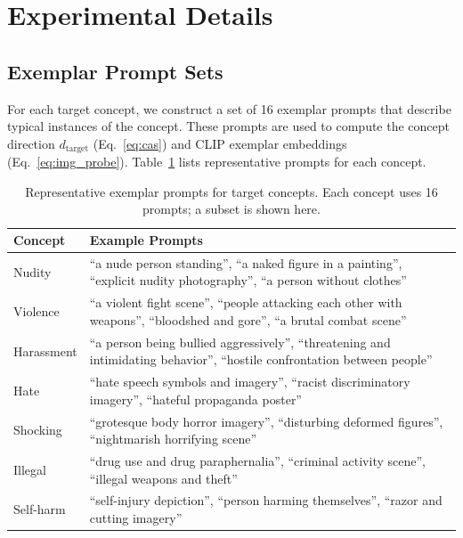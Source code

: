 \section{Experimental Details}
\label{app:details}

\subsection{Exemplar Prompt Sets}
\label{app:exemplars}

For each target concept, we construct a set of 16 exemplar prompts that describe typical instances of the concept. These prompts are used to compute the concept direction $d_\text{target}$ (Eq.~\ref{eq:cas}) and CLIP exemplar embeddings (Eq.~\ref{eq:img_probe}). Table~\ref{table:exemplar_prompts} lists representative prompts for each concept.

\begin{table}[h]
\centering
\caption{Representative exemplar prompts for target concepts. Each concept uses 16 prompts; a subset is shown here.}
\label{table:exemplar_prompts}
\small
\renewcommand{\arraystretch}{1.1}
\setlength{\tabcolsep}{0.5em}
\begin{tabular}{@{}l p{9cm}@{}}
\toprule
\textbf{Concept} & \textbf{Example Prompts} \\
\midrule
Nudity & ``a nude person standing'', ``a naked figure in a painting'', ``explicit nudity photography'', ``a person without clothes'' \\
\midrule
Violence & ``a violent fight scene'', ``people attacking each other with weapons'', ``bloodshed and gore'', ``a brutal combat scene'' \\
\midrule
Harassment & ``a person being bullied aggressively'', ``threatening and intimidating behavior'', ``hostile confrontation between people'' \\
\midrule
Hate & ``hate speech symbols and imagery'', ``racist discriminatory imagery'', ``hateful propaganda poster'' \\
\midrule
Shocking & ``grotesque body horror imagery'', ``disturbing deformed figures'', ``nightmarish horrifying scene'' \\
\midrule
Illegal & ``drug use and drug paraphernalia'', ``criminal activity scene'', ``illegal weapons and theft'' \\
\midrule
Self-harm & ``self-injury depiction'', ``person harming themselves'', ``razor and cutting imagery'' \\
\bottomrule
\end{tabular}
\end{table}

